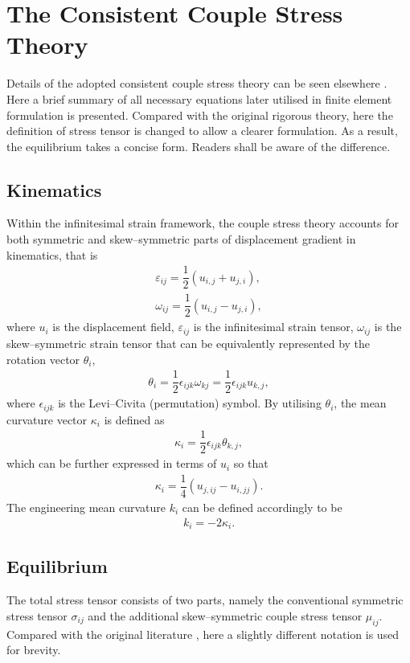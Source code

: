 \documentclass[3p,sort&compress,11pt,fleqn,review]{elsarticle}
\newcommand*{\alert}[1]{#1}
\begin{document}
\section{The Consistent Couple Stress Theory}
Details of the adopted consistent couple stress theory can be seen elsewhere \citep{Hadjesfandiari2011}. Here a brief summary of all necessary equations later utilised in finite element formulation is presented. \alert{Compared with the original rigorous theory, here the definition of stress tensor is changed to allow a clearer formulation. As a result, the equilibrium takes a concise form. Readers shall be aware of the difference.}
\subsection{Kinematics}
Within the infinitesimal strain framework, the couple stress theory \citep{Hadjesfandiari2011} accounts for both symmetric and skew--symmetric parts of displacement gradient in kinematics, that is
\begin{gather}\label{eq:varepsilon}
\varepsilon_{ij}=\dfrac{1}{2}\left(u_{i,j}+u_{j,i}\right),\\
\omega_{ij}=\dfrac{1}{2}\left(u_{i,j}-u_{j,i}\right),
\end{gather}
where $u_i$ is the displacement field, $\varepsilon_{ij}$ is the infinitesimal strain tensor, $\omega_{ij}$ is the skew--symmetric strain tensor that can be equivalently represented by the rotation vector $\theta_i$,
\begin{gather}\label{eq:theta}
\theta_i=\dfrac{1}{2}\epsilon_{ijk}\omega_{kj}=\dfrac{1}{2}\epsilon_{ijk}u_{k,j},
\end{gather}
where $\epsilon_{ijk}$ is the Levi--Civita (permutation) symbol. By utilising $\theta_i$, the mean curvature vector $\kappa_i$ is defined as
\begin{gather}\label{eq:kappa}
\kappa_i=\dfrac{1}{2}\epsilon_{ijk}\theta_{k,j},
\end{gather}
which can be further expressed in terms of $u_i$ so that
\begin{gather}
\kappa_i=\dfrac{1}{4}\left(u_{j,ij}-u_{i,jj}\right).
\end{gather}
The engineering mean curvature $k_i$ can be defined accordingly to be
\begin{gather}
k_i=-2\kappa_i.
\end{gather}
\subsection{Equilibrium}
The total stress tensor consists of two parts, namely the conventional symmetric stress tensor $\sigma_{ij}$ and the additional skew--symmetric couple stress tensor $\mu_{ij}$. Compared with the original literature \citep{Hadjesfandiari2011}, here a slightly different notation is used for brevity.
\end{document}
